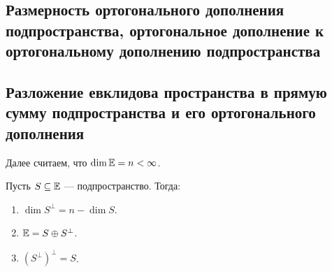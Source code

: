 \subsection{Размерность ортогонального дополнения подпространства, ортогональное дополнение к ортогональному дополнению подпространства}
\subsection{Разложение евклидова пространства в прямую сумму подпространства и его ортогонального дополнения}

Далее считаем, что $\dim \mathbb{E} = n < \infty$.

\begin{proposal}
    Пусть $S \subseteq \mathbb{E}$ --- подпространство.
    Тогда:
    \begin{enumerate}
    \item $\dim S^{\perp} = n - \dim S$.
    \item $\mathbb{E} = S \oplus S^{\perp}$.
    \item $(S^{\perp})^{\perp} = S$.
    \end{enumerate}
\end{proposal}

